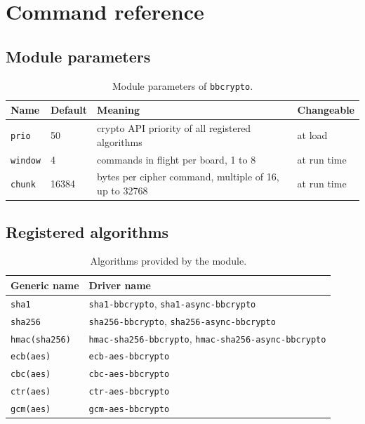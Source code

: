 \documentclass[11pt,a4paper,oneside]{report}
\newcommand{\code}[1]{\texttt{\small #1}}
\begin{document}
\appendix
\chapter{Command reference}

\section{Module parameters}

\begin{table}[ht]
\centering
\begin{tabularx}{\textwidth}{llXl}
\toprule
Name & Default & Meaning & Changeable \\
\midrule
\code{prio} & 50 & crypto API priority of all registered algorithms & at load \\
\code{window} & 4 & commands in flight per board, 1 to 8 & at run time \\
\code{chunk} & 16384 & bytes per cipher command, multiple of 16, up to 32768 & at run time \\
\bottomrule
\end{tabularx}
\caption{Module parameters of \code{bbcrypto}.}
\end{table}

\section{Registered algorithms}

\begin{table}[ht]
\centering
\begin{tabular}{ll}
\toprule
Generic name & Driver name \\
\midrule
\code{sha1} & \code{sha1-bbcrypto}, \code{sha1-async-bbcrypto} \\
\code{sha256} & \code{sha256-bbcrypto}, \code{sha256-async-bbcrypto} \\
\code{hmac(sha256)} & \code{hmac-sha256-bbcrypto}, \code{hmac-sha256-async-bbcrypto} \\
\code{ecb(aes)} & \code{ecb-aes-bbcrypto} \\
\code{cbc(aes)} & \code{cbc-aes-bbcrypto} \\
\code{ctr(aes)} & \code{ctr-aes-bbcrypto} \\
\code{gcm(aes)} & \code{gcm-aes-bbcrypto} \\
\bottomrule
\end{tabular}
\caption{Algorithms provided by the module.}
\end{table}
\end{document}
